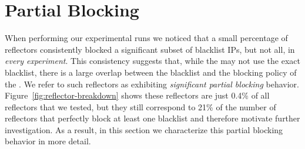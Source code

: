 \section{Partial Blocking}
\label{sec:partial-blocking}


When performing our experimental runs we noticed that a small
percentage of reflectors consistently blocked a significant subset of
blacklist IPs, but not all, in \textit{every experiment}.
This consistency suggests that, while the
{} may not use the exact blacklist, there is a large overlap
between the blacklist and the blocking policy of the {}.  We
refer to such reflectors as exhibiting \textit{significant partial blocking}
behavior.  Figure~\ref{fig:reflector-breakdown} shows these reflectors
are just 0.4\% of all reflectors that we tested, but they still
correspond to 21\% of the number of reflectors that perfectly block at
least one blacklist and therefore motivate further investigation.  As
a result, in this section we characterize this partial blocking
behavior in more detail.




